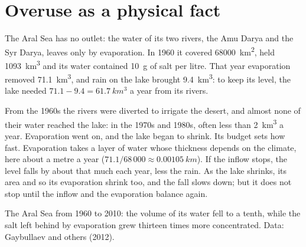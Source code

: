 \section{Overuse as a physical fact}

The Aral Sea has no outlet: the water of its two rivers, the Amu Darya and
the Syr Darya, leaves only by evaporation. In 1960 it covered
\qty{68000}{km^2}, held \qty{1093}{km^3} and its water contained \qty{10}{g}
of salt per litre. That year evaporation removed \qty{71.1}{km^3}, and rain
on the lake brought \qty{9.4}{km^3}: to keep its level, the lake needed
$71.1 - 9.4 = \qty{61.7}{km^3}$ a year from its rivers.

From the 1960s the rivers were diverted to irrigate the desert, and almost
none of their water reached the lake: in the 1970s and 1980s, often less
than \qty{2}{km^3} a year. Evaporation went on, and the lake
began to shrink. Its budget sets how fast. Evaporation takes a layer of water
whose thickness depends on the climate, here about a metre a year
($71.1/68\,000 \approx \qty{0.00105}{km}$). If the inflow stops, the level
falls by about that much each year, less the rain. As the lake shrinks, its
area and so its evaporation shrink too, and the fall slows down; but it does
not stop until the inflow and the evaporation balance again.

\begin{omfigure}

{\small The Aral Sea from 1960 to 2010: the volume of its water fell to a
tenth, while the salt left behind by evaporation grew thirteen times more
concentrated. Data: Gaybullaev and others (2012).}
\end{omfigure}

